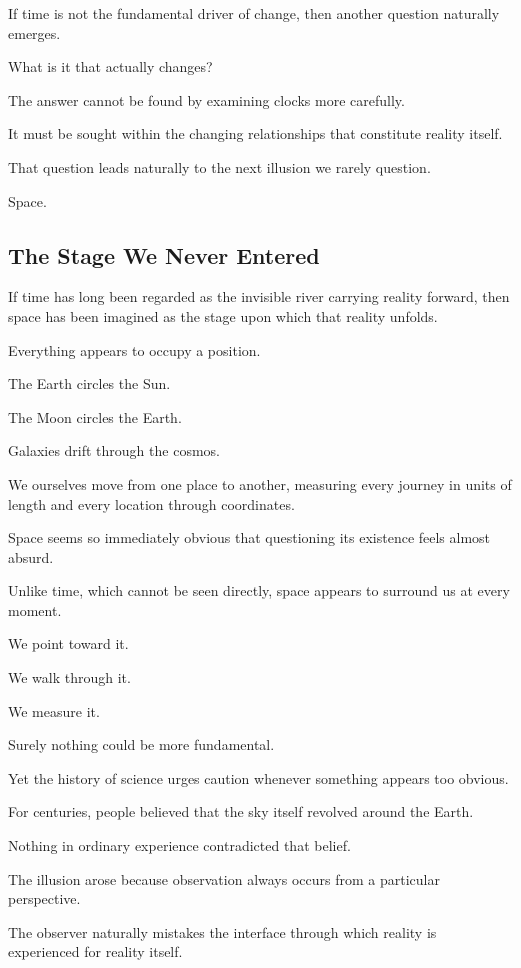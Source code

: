 If time is not the fundamental driver of change, then another question naturally emerges.

What is it that actually changes?

The answer cannot be found by examining clocks more carefully.

It must be sought within the changing relationships that constitute reality itself.

That question leads naturally to the next illusion we rarely question.

Space.

\subsection{\textbf{The Stage We Never Entered}}


If time has long been regarded as the invisible river carrying reality forward, then space has been imagined as the stage upon which that reality unfolds.

Everything appears to occupy a position.

The Earth circles the Sun.

The Moon circles the Earth.

Galaxies drift through the cosmos.

We ourselves move from one place to another, measuring every journey in units of length and every location through coordinates.

Space seems so immediately obvious that questioning its existence feels almost absurd.

Unlike time, which cannot be seen directly, space appears to surround us at every moment.

We point toward it.

We walk through it.

We measure it.

Surely nothing could be more fundamental.

Yet the history of science urges caution whenever something appears too obvious.

For centuries, people believed that the sky itself revolved around the Earth.

Nothing in ordinary experience contradicted that belief.

The illusion arose because observation always occurs from a particular perspective.

The observer naturally mistakes the interface through which reality is experienced for reality itself.

